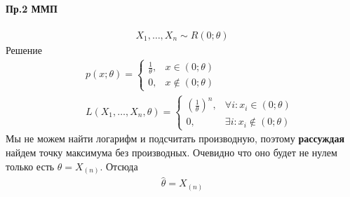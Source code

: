 \documentclass[12pt]{extarticle}
\begin{document}
\paragraph{Пр.2 ММП}
\begin{eqnarray*}
    X_{1},\ldots,X_{n}\sim R(0;\theta)
\end{eqnarray*}
Решение
\begin{eqnarray*}
    &&p(x;\theta)=
    \left\{\begin{array}{ll}
            \frac{1}{\theta},&x\in (0;\theta)\\
            0,&x\notin (0;\theta)
    \end{array}\right.\\
    &&L(X_{1},\ldots,X_{n},\theta)=
    \left\{ \begin{array}{ll}
            \left(\frac{1}{\theta}\right)^{n},&\forall i:x_{i}\in
            (0;\theta)\\
            0,&\exists i:x_{i}\notin (0;\theta)
    \end{array}
    \right.
\end{eqnarray*}
Мы не можем найти логарифм и подсчитать производную, поэтому
\textbf{рассуждая} найдем точку максимума без производных. Очевидно что
оно будет не нулем только есть $\theta = X_{(n)}$. Отсюда
\begin{eqnarray*}
    \hat{\theta}=X_{(n)}
\end{eqnarray*}
\end{document}
